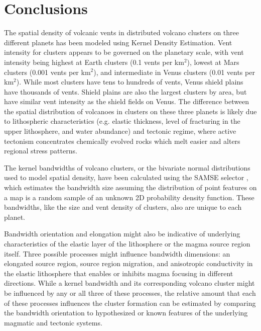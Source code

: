 \section{Conclusions}
The spatial density of volcanic vents in distributed volcano clusters on three different planets has been modeled using Kernel Density Estimation. Vent intensity for clusters appears to be governed on the planetary scale, with vent intensity being highest at Earth clusters (0.1 vents per km$^2$), lowest at Mars clusters (0.001 vents per km$^2$), and intermediate in Venus clusters (0.01 vents per km$^2$). While most clusters have tens to hundreds of vents, Venus shield plains have thousands of vents. Shield plains are also the largest clusters by area, but have similar vent intensity as the shield fields on Venus. The difference between the spatial distribution of volcanoes in clusters on these three planets is likely due to lithospheric characteristics (e.g. elastic thickness, level of fracturing in the upper lithosphere, and water abundance) and tectonic regime, where active tectonism concentrates chemically evolved rocks which melt easier and alters regional stress patterns.

The kernel bandwidths of volcano clusters, or the bivariate normal distributions used to model spatial density, have been calculated using the SAMSE selector \citep{duong2007}, which estimates the bandwidth size assuming the distribution of point features on a map is a random sample of an unknown 2D probability density function. These bandwidths, like the size and vent density of clusters, also are unique to each planet. 

Bandwidth orientation and elongation might also be indicative of underlying characteristics of the elastic layer of the lithosphere or the magma source region itself. Three possible processes might influence bandwidth dimensions: an elongated source region, source region migration, and anisotropic conductivity in the elastic lithosphere that enables or inhibits magma focusing in different directions. While a kernel bandwidth and its corresponding volcano cluster might be influenced by any or all three of these processes, the relative amount that each of these processes influences the cluster formation can be estimated by comparing the bandwidth orientation to hypothesized or known features of the underlying magmatic and tectonic systems.


% 


